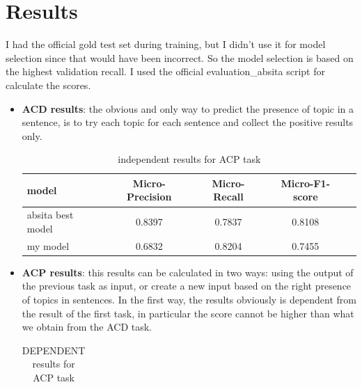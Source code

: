\documentclass{article}
\begin{document}
    \section{Results}\label{sec:s5}
        I had the official gold test set during training, but I didn't use it for model selection since that would have been incorrect.
        So the model selection is based on the highest validation recall.
        I used the official evaluation\_absita script for calculate the scores.
        \begin{itemize}
            \item \textbf{ACD results}: the obvious and only way to predict the presence of topic in a sentence, is to try each topic for each sentence and collect the positive results only.
                \begin{table}[h!]
                    \begin{center}
                        \caption{independent results for ACP task}
                        \label{tab:table2}
                        \begin{tabular}{l|c|c|c|r}
                            \textbf{model} & \textbf{Micro-Precision} & \textbf{Micro-Recall} & \textbf{Micro-F1-score}\\
                            \hline
                                absita best model & 0.8397 & 0.7837 & 0.8108\\
                                my model & 0.6832 & 0.8204 & 0.7455\\
                        \end{tabular}
                    \end{center}
                \end{table}
            \item \textbf{ACP results}: this results can be calculated in two ways: using the output of the previous task as input, or create a new input based on the right presence of topics in sentences.
                In the first way, the results obviously is dependent from the result of the first task, in particular the score cannot be higher than what we obtain from the ACD task.
                \begin{table}[h!]
                    \begin{center}
                        \caption{DEPENDENT results for ACP task}
                        \label{tab:table3}
                        \begin{tabular}{l|c|c|r}

\end{tabular}
\end{center}
\end{table}
\end{itemize}
\end{document}
